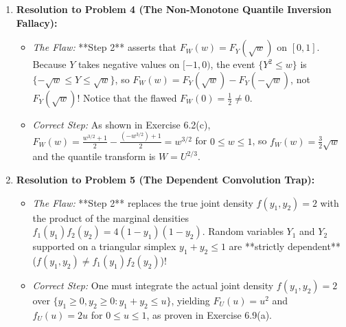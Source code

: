 \documentclass[11pt, letterpaper]{article}
\theoremstyle{definition}
\theoremstyle{remark}
\begin{document}
\begin{enumerate}
    \item \textbf{Resolution to Problem 4 (The Non-Monotone Quantile Inversion Fallacy):}
    \begin{itemize}
        \item \textit{The Flaw:} **Step 2** asserts that $F_W(w) = F_Y(\sqrt{w})$ on $[0, 1]$. Because $Y$ takes negative values on $[-1, 0)$, the event $\{Y^2 \le w\}$ is $\{-\sqrt{w} \le Y \le \sqrt{w}\}$, so $F_W(w) = F_Y(\sqrt{w}) - F_Y(-\sqrt{w})$, not $F_Y(\sqrt{w})$! Notice that the flawed $F_W(0) = \frac{1}{2} \neq 0$.
        \item \textit{Correct Step:} As shown in Exercise 6.2(c), $F_W(w) = \frac{w^{3/2} + 1}{2} - \frac{(-w^{3/2}) + 1}{2} = w^{3/2}$ for $0 \le w \le 1$, so $f_W(w) = \frac{3}{2}\sqrt{w}$ and the quantile transform is $W = U^{2/3}$.
    \end{itemize}

    \item \textbf{Resolution to Problem 5 (The Dependent Convolution Trap):}
    \begin{itemize}
        \item \textit{The Flaw:} **Step 2** replaces the true joint density $f(y_1, y_2) = 2$ with the product of the marginal densities $f_1(y_1)f_2(y_2) = 4(1-y_1)(1-y_2)$. Random variables $Y_1$ and $Y_2$ supported on a triangular simplex $y_1 + y_2 \le 1$ are **strictly dependent** ($f(y_1, y_2) \neq f_1(y_1)f_2(y_2)$)!
        \item \textit{Correct Step:} One must integrate the actual joint density $f(y_1, y_2) = 2$ over $\{y_1 \ge 0, y_2 \ge 0 : y_1 + y_2 \le u\}$, yielding $F_U(u) = u^2$ and $f_U(u) = 2u$ for $0 \le u \le 1$, as proven in Exercise 6.9(a).
    \end{itemize}
\end{enumerate}
\end{document}
